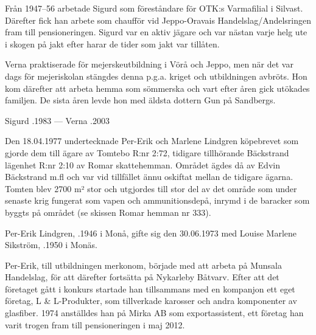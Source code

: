 Från 1947--56 arbetade Sigurd som föreståndare för OTK:s Varmafilial i Silvast. Därefter fick han arbete som chaufför vid Jeppo-Oravais Handelslag/Andelsringen fram till pensioneringen. Sigurd var en aktiv jägare och var nästan varje helg ute i skogen på jakt efter harar de tider som jakt var tillåten.

Verna praktiserade för mejerskeutbildning i Vörå och Jeppo, men när det var dags för mejeriskolan stängdes denna p.g.a. kriget och utbildningen avbröts. Hon kom därefter att arbeta hemma som sömmerska och vart efter åren gick utökades familjen. De sista åren levde hon med äldsta dottern Gun på Sandbergs.
\begin{jhchildren}
  \item {}
  \item {}
  \item {}
  \item {}
  \item {}
\end{jhchildren}

Sigurd .1983  ---  Verna .2003





Den 18.04.1977 undertecknade Per-Erik och Marlene Lindgren köpebrevet som gjorde dem till ägare av Tomtebo R:nr 2:72, tidigare tillhörande Bäckstrand lägenhet R:nr 2:10 av Romar skattehemman. Området ägdes då av Edvin Bäckstrand m.fl och var vid tillfället ännu oskiftat mellan de tidigare ägarna. Tomten blev 2700 m² stor och utgjordes till stor del av det område som under senaste krig fungerat som vapen och ammunitionsdepå, inrymd i de baracker som byggts på området (se skissen Romar hemman nr 333).

Per-Erik Lindgren, .1946 i Monå, gifte sig den 30.06.1973 med Louise Marlene Sikström, .1950 i Monäs.

Per-Erik, till utbildningen  merkonom, började med att arbeta på Munsala Handelslag, för att därefter fortsätta på Nykarleby Båtvarv. Efter att det företaget gått i konkurs startade han tillsammans med en kompanjon ett eget företag, L \& L-Produkter, som tillverkade karosser och andra komponenter av glasfiber. 1974 anställdes han på Mirka AB som exportassistent, ett företag han varit trogen fram till pensioneringen i maj 2012.

